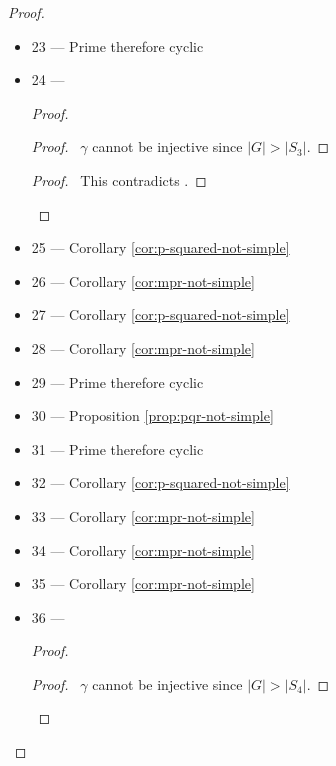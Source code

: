 \begin{proof}
\begin{itemize}
\item 23 --- Prime therefore cyclic
\item 24 ---
\begin{proof}
	\begin{proof}
		\pf\ $\gamma$ cannot be injective since $|G| > |S_3|$.
	\end{proof}
	\qedstep
	\begin{proof}
		\pf\ This contradicts .
	\end{proof}
\end{proof}
\item 25 --- Corollary \ref{cor:p-squared-not-simple}
\item 26 --- Corollary \ref{cor:mpr-not-simple}
\item 27 --- Corollary \ref{cor:p-squared-not-simple}
\item 28 --- Corollary \ref{cor:mpr-not-simple}
\item 29 --- Prime therefore cyclic
\item 30 --- Proposition \ref{prop:pqr-not-simple} 
\item 31 --- Prime therefore cyclic
\item 32 --- Corollary \ref{cor:p-squared-not-simple}
\item 33 --- Corollary \ref{cor:mpr-not-simple}
\item 34 --- Corollary \ref{cor:mpr-not-simple}
\item 35 --- Corollary \ref{cor:mpr-not-simple}
\item 36 ---
\begin{proof}
	\begin{proof}
		\pf\ $\gamma$ cannot be injective since $|G| > |S_4|$.
	\end{proof}

\end{proof}
\end{itemize}
\end{proof}
